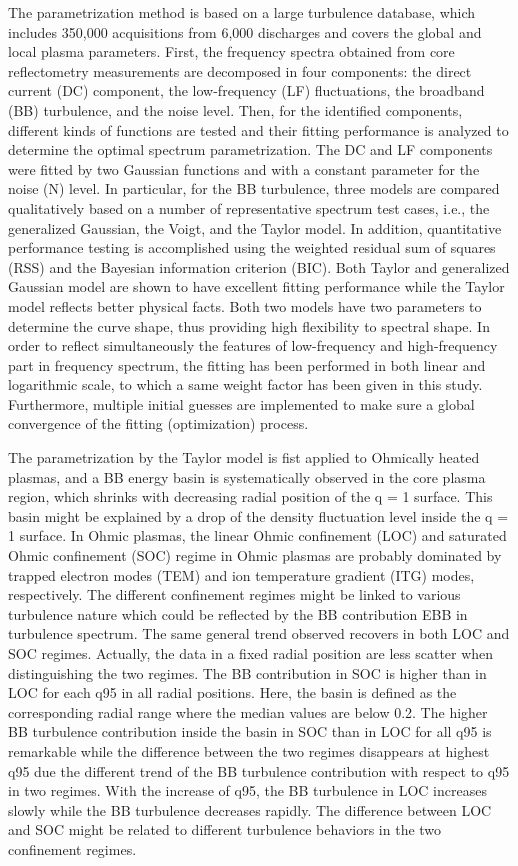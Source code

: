 The parametrization method is based on a large turbulence database, which includes 350,000 acquisitions from 6,000 discharges and covers the global and local plasma parameters. First, the frequency spectra obtained from core reflectometry measurements are decomposed in four components: the direct current (DC) component, the low-frequency (LF) fluctuations, the broadband (BB) turbulence, and the noise level. Then, for the identified components, different kinds of functions are tested and their fitting performance is analyzed to determine the optimal spectrum parametrization. The DC and LF components were fitted by two Gaussian functions and with a constant parameter for the noise (N) level. In particular, for the BB turbulence, three models are compared qualitatively based on a number of representative spectrum test cases, i.e., the generalized Gaussian, the Voigt, and the Taylor model. In addition, quantitative performance testing is accomplished using the weighted residual sum of squares (RSS) and the Bayesian information criterion (BIC). Both Taylor and generalized Gaussian model are shown to have excellent fitting performance while the Taylor model reflects better physical facts. Both two models have two parameters to determine the curve shape, thus providing high flexibility to spectral shape. In order to reflect simultaneously the features of low-frequency and high-frequency part in frequency spectrum, the fitting has been performed in both linear and logarithmic scale, to which a same weight factor has been given in this study. Furthermore, multiple initial guesses are implemented to make sure a global convergence of the fitting (optimization) process.

The parametrization by the Taylor model is fist applied to Ohmically heated plasmas, and a BB energy basin is systematically observed in the core plasma region, which shrinks with decreasing radial position of the q = 1 surface. This basin might be explained by a drop of the density fluctuation level inside the q = 1 surface. In Ohmic plasmas, the linear Ohmic confinement (LOC) and saturated Ohmic confinement (SOC) regime in Ohmic plasmas are probably dominated by trapped electron modes (TEM) and ion temperature gradient (ITG) modes, respectively. The different confinement regimes might be linked to various turbulence nature which could be reflected by the BB contribution EBB in turbulence spectrum. The same general trend observed recovers in both LOC and SOC regimes. Actually, the data in a fixed radial position are less scatter when distinguishing the two regimes. The BB contribution in SOC is higher than in LOC for each q95 in all radial positions. Here, the basin is defined as the corresponding radial range where the median values are below 0.2. The higher BB turbulence contribution inside the basin in SOC than in LOC for all q95 is remarkable while the difference between the two regimes disappears at highest q95 due the different trend of the BB turbulence contribution with respect to q95 in two regimes. With the increase of q95, the BB turbulence in LOC increases slowly while the BB turbulence decreases rapidly. The difference between LOC and SOC might be related to different turbulence behaviors in the two confinement regimes.

